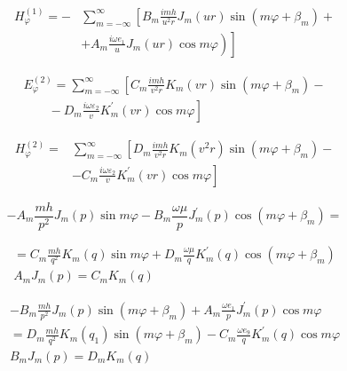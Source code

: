  \begin{equation}\begin{aligned}
 H_{\varphi}^{(1)}=-& \sum_{m=-\infty}^{\infty}\left[B_{m} \frac{i m h}{u^{2} r} J_{m}(u r) \sin \left(m \varphi+\beta_{m}\right)+\right.\\
 &\left.\left.+A_{m} \frac{i \omega e_{1}}{u} J_{m}(u r) \cos m \varphi\right)\right]
 \end{aligned}
 \end{equation}
 
 
 \begin{equation}\begin{array}{l}
 E_{\varphi}^{(2)}=\sum_{m=-\infty}^{\infty}\left[C_{m} \frac{i m h}{v^{2} r} K_{m}(v r) \sin \left(m \varphi+\beta_{m}\right)-\right. \\
 \left.\qquad-D_{m} \frac{i \omega \varepsilon_{2}}{v} K_{m}^{\prime}(v r) \cos m \varphi\right]
 \end{array}\end{equation}
 
 \begin{equation}\begin{aligned}
 H_{\varphi}^{(2)}=& \sum_{m=-\infty}^{\infty}\left[D_{m} \frac{i m h}{v^{2} r} K_{m}\left(v^{2} r\right) \sin \left(m \varphi+\beta_{m}\right)-\right.\\
 &\left.-C_{m} \frac{i \omega \varepsilon_{2}}{v} K_{m}^{\prime}(v r) \cos m \varphi\right]
 \end{aligned}\end{equation}
 
 
 \begin{equation}-A_{m} \frac{m h}{p^{2}} J_{m}(p) \sin m \varphi-B_{m} \frac{\omega \mu}{p} J_{m}^{\prime}(p) \cos \left(m \varphi+\beta_{m}\right)=\end{equation}
 
 \begin{equation}\begin{array}{c}
 =C_{m} \frac{m h}{q^{2}} K_{m}(q) \sin m \varphi+D_{m} \frac{\omega \mu}{q} K_{m}^{\prime}(q) \cos \left(m \varphi+\beta_{m}\right) \\
 A_{m} J_{m}(p)=C_{m} K_{m}(q)
 \end{array}\end{equation}
 
 \begin{equation}\begin{array}{c}
 -B_{m} \frac{m h}{p^{2}} J_{m}(p) \sin \left(m \varphi+\beta_{m}\right)+A_{m} \frac{\omega e_{1}}{p} J_{m}^{\prime}(p) \cos m \varphi \\
 =D_{m} \frac{m h}{q^{2}} K_{m}\left(q_{1}\right) \sin \left(m \varphi+\beta_{m}\right)-C_{m} \frac{\omega e_{9}}{q} K_{m}^{\prime}(q) \cos m \varphi \\
 B_{m} J_{m}(p)=D_{m} K_{m}(q)
 \end{array}\end{equation}
 
